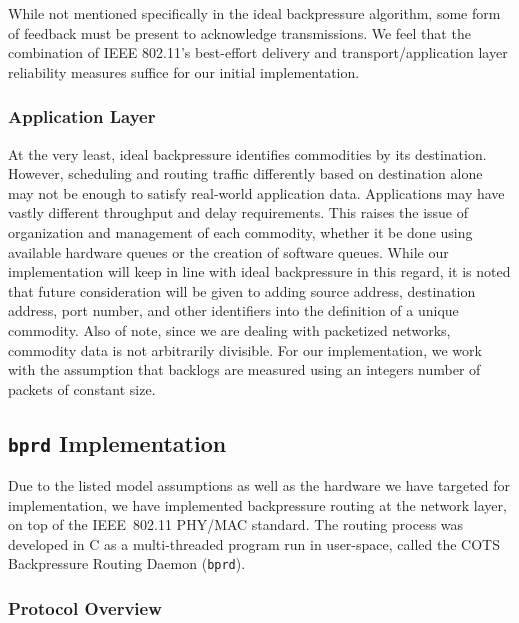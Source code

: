 \documentclass{article}
\newcommand{\bprd}{\texttt{bprd}\xspace}
\begin{document}
While not mentioned specifically in the ideal backpressure algorithm, some form of feedback must be present to acknowledge transmissions.
We feel that the combination of IEEE 802.11's best-effort delivery and transport/application layer reliability measures suffice for our initial implementation.


\subsubsection{Application Layer}

At the very least, ideal backpressure identifies commodities by its destination.
However, scheduling and routing traffic differently based on destination alone may not be enough to satisfy real-world application data.
Applications may have vastly different throughput and delay requirements.
This raises the issue of organization and management of each commodity, whether it be done using available hardware queues or the creation of software queues.
While our implementation will keep in line with ideal backpressure in this regard, it is noted that future consideration will be given to adding source address, destination address, port number, and other identifiers into the definition of a unique commodity.
Also of note, since we are dealing with packetized networks, commodity data is not arbitrarily divisible.
For our implementation, we work with the assumption that backlogs are measured using an integers number of packets of constant size.


\subsection{\bprd Implementation}
\label{sec:practice-implementation}

Due to the listed model assumptions as well as the hardware we have targeted for implementation, we have implemented backpressure routing at the network layer, on top of the IEEE~802.11 PHY/MAC standard.
The routing process was developed in C as a multi-threaded program run in user-space, called the COTS Backpressure Routing Daemon (\bprd).


\subsubsection{Protocol Overview}
\end{document}
